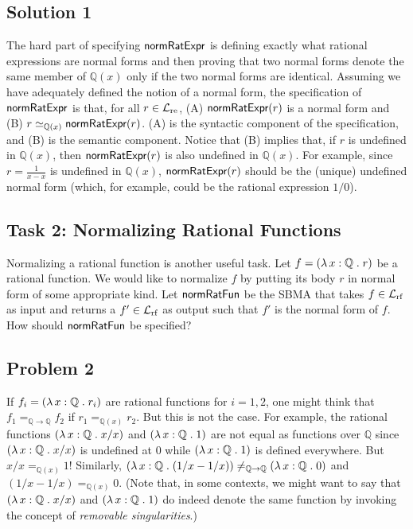 \documentclass[fleqn]{llncs}
\newcommand{\QQ}{\ensuremath{\mathbb{Q}}}
\newcommand{\NRE}{\ensuremath{\mname{normRatExpr}}}
\newcommand{\NRF}{\ensuremath{\mname{normRatFun}}}
\newcommand{\funQ}[1]{\ensuremath{\LambdaApp x : \QQ \mdot #1}}
\newcommand{\Langre}{\ensuremath{\mathcal{L}}_{\rm re}}
\newcommand{\Langrf}{\ensuremath{\mathcal{L}}_{\rm rf}}
\begin{document}
\subsection{Solution 1}

The hard part of specifying $\NRE$ is defining exactly what rational
expressions are normal forms and then proving that two normal forms
denote the same member of $\QQ(x)$ only if the two normal forms are
identical.  Assuming we have adequately defined the notion of a normal
form, the specification of $\NRE$ is that, for all $r \in \Langre$,
(A) $\NRE(r)$ is a normal form and (B) $r \simeq_{\QQ(x)} \NRE(r)$.
(A) is the syntactic component of the specification, and (B) is the
semantic component.  Notice that (B) implies that, if $r$ is undefined
in $\QQ(x)$, then $\NRE(r)$ is also undefined in $\QQ(x)$.  For
example, since $r = \frac{1}{x - x}$ is undefined in $\QQ(x)$,
$\NRE(r)$ should be the (unique) undefined normal form (which, for example,
could be the rational expression $1/0$).

\subsection{Task 2: Normalizing Rational Functions}

Normalizing a rational function is another useful task.  Let $f =
(\funQ{r})$ be a rational function.  We would like to normalize $f$ by
putting its body $r$ in normal form of some appropriate kind.  Let
$\NRF$ be the SBMA that takes $f \in \Langrf$ as input and returns a
$f' \in \Langrf$ as output such that $f'$ is the normal form of $f$.
How should $\NRF$ be specified?

\subsection{Problem 2}

If $f_i = (\funQ{r_i})$ are rational functions for $i=1,2$, one might
think that $f_1 =_{\QQ \rightarrow \QQ} f_2$ if $r_1 =_{\QQ(x)} r_2$.
But this is not the case.  For example, the rational functions
$(\funQ{x/x})$ and $(\funQ{1})$ are not equal as functions over $\QQ$
since $(\funQ{x/x})$ is undefined at 0 while $(\funQ{1})$ is defined
everywhere.  But $x/x =_{\QQ(x)} 1$! Similarly, $(\funQ{(1/x - 1/x)})
\not=_{\QQ \rightarrow \QQ} (\funQ{0})$ and $(1/x - 1/x) =_{\QQ(x)}
0$.  (Note that, in some contexts, we might want to say that
$(\funQ{x/x})$ and $(\funQ{1})$ do indeed denote the same function by
invoking the concept of \emph{removable singularities}.)
\end{document}
